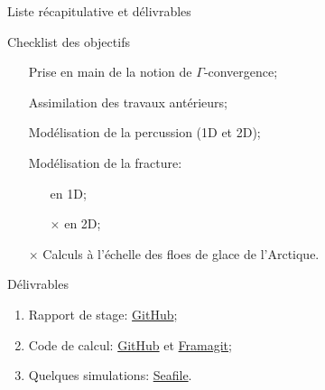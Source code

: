 \begin{frame}{Liste récapitulative et délivrables}

        \begin{block}{Checklist des objectifs}
    	\begin{enumerate}
      	\item[\checkmark] Prise en main de la notion de $\Gamma$‑convergence; \pause
      	\item[\checkmark] Assimilation des travaux antérieurs; \pause
      	\item[\checkmark] Modélisation de la percussion (1D et 2D); \pause
      	\item[\checkmark] Modélisation de la fracture: 
      	\begin{itemize}
        \item[\checkmark] en 1D;
        \item[$\times$] en 2D; 
        \end{itemize} \pause
      	\item[$\times$] Calculs à l'échelle des floes de glace de l'Arctique. 
      	\end{enumerate}
		\end{block}
	
        \pause
        \begin{exampleblock}{Délivrables}
        \begin{enumerate}
        \item Rapport de stage: \myemoji \textcolor{orange}{\href{https://github.com/desmond-rn/ice-floes/tree/master/pdf}{ GitHub}};
        \item Code de calcul: \myemoji \textcolor{orange}{\href{https://github.com/desmond-rn/ice-floes/tree/master/code}{ GitHub}} et \myemoji \textcolor{orange}{\href{https://framagit.org/RaK/SimuRessorts}{ Framagit}};
        \item Quelques simulations: \myemoji \textcolor{orange}{\href{https://seafile.unistra.fr/d/a6c3680909624b22be7c/}{ Seafile}}.
        \end{enumerate}
		\end{exampleblock}
    
\end{frame}
